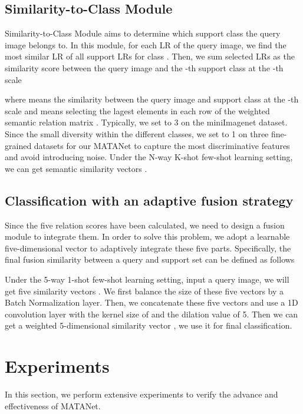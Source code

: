 \documentclass[final]{cvpr}
\begin{document}
	\subsection{Similarity-to-Class Module}
	Similarity-to-Class Module aims to determine which support class the query image belongs to. In this module, for each LR of the query image, we find the  most similar LR of all support LRs for class . Then, we sum  selected LRs as the similarity score between the query image and the -th support class at the -th scale
	
	where  means the similarity between the query image and support class  at the -th scale and  means selecting the  lagest elements in each row of the weighted semantic relation matrix . 
	Typically, we set  to 3 on the miniImagenet dataset. 
	Since the small diversity within the different classes, we set  to 1 on three fine-grained datasets for our MATANet to capture the most discriminative features and avoid introducing noise.
	Under the N-way K-shot few-shot learning setting, we can get semantic similarity vectors .
	
	






	\subsection{Classification with an adaptive fusion strategy}
	
	Since the five relation scores have been calculated, we need to design a fusion module to integrate them. In order to solve this problem, we adopt a learnable five-dimensional  vector to adaptively integrate these five parts. Specifically, the final fusion similarity between a query  and support set  can be defined as follows
	
	Under the 5-way 1-shot few-shot learning setting, input a query image, we will get  five similarity vectors . We first balance the size of these five vectors by a Batch Normalization layer. Then, we concatenate these five vectors and use a 1D convolution layer with the kernel size of  and the dilation value of 5. Then we can get a weighted 5-dimensional similarity vector , we use it for final classification. 
		
	\section{Experiments}
	In this section, we perform extensive experiments to verify the advance and effectiveness of MATANet. 
\end{document}
